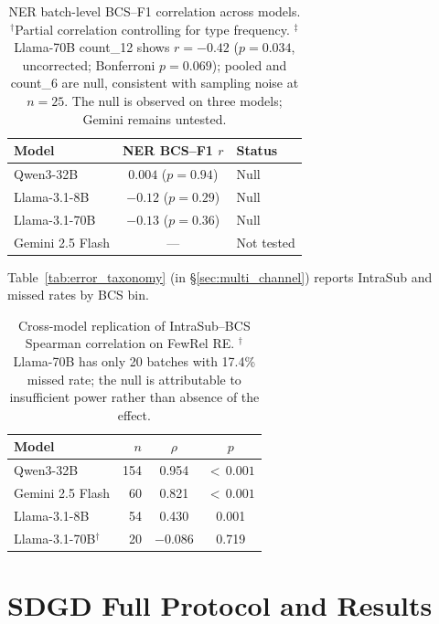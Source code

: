 \documentclass[11pt]{article}
\begin{document}
\begin{table}[h]
\centering
\small
\caption{NER batch-level BCS--F1 correlation across models. $^\dagger$Partial correlation controlling for type frequency. $^\ddagger$Llama-70B count\_12 shows $r{=}{-}0.42$ ($p{=}0.034$, uncorrected; Bonferroni $p{=}0.069$); pooled and count\_6 are null, consistent with sampling noise at $n{=}25$. The null is observed on three models; Gemini remains untested.}
\label{tab:cross_model_ner_null}
\begin{tabular}{lcl}
\toprule
\textbf{Model} & \textbf{NER BCS--F1 $r$} & \textbf{Status} \\
\midrule
Qwen3-32B & $0.004$ ($p = 0.94$) & Null \\
Llama-3.1-8B & $-0.12$ ($p = 0.29$)\rlap{$^\dagger$} & Null \\
Llama-3.1-70B & $-0.13$ ($p = 0.36$)\rlap{$^\ddagger$} & Null \\
Gemini 2.5 Flash & --- & Not tested \\
\bottomrule
\end{tabular}
\end{table}

Table~\ref{tab:error_taxonomy} (in \S\ref{sec:multi_channel}) reports IntraSub and missed rates by BCS bin.

\begin{table}[t]
\centering
\small
\caption{Cross-model replication of IntraSub--BCS Spearman correlation on FewRel RE. $^\dagger$Llama-70B has only 20 batches with 17.4\% missed rate; the null is attributable to insufficient power rather than absence of the effect.}
\label{tab:cross_model_error_taxonomy}
\begin{tabular}{lrcc}
\toprule
\textbf{Model} & $n$ & $\rho$ & $p$ \\
\midrule
Qwen3-32B & 154 & 0.954 & ${<}\,0.001$ \\
Gemini 2.5 Flash & 60 & 0.821 & ${<}\,0.001$ \\
Llama-3.1-8B & 54 & 0.430 & 0.001 \\
Llama-3.1-70B$^\dagger$ & 20 & $-$0.086 & 0.719 \\
\bottomrule
\end{tabular}
\end{table}

\section{SDGD Full Protocol and Results}
\label{sec:appendix_sdgd}
\end{document}
